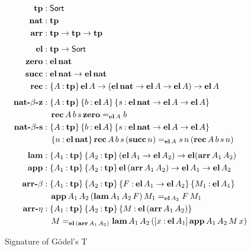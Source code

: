 \documentclass[11pt,twoside]{article}
\newcommand{\braces}[1]{\{#1\}}
\newcommand{\bracks}[1]{[#1]}
\newcommand{\parens}[1]{(#1)}
\newcommand{\sortclass}{\ensuremath{\textsf{Sort}}}
\newcommand{\eqclass}[3]{{#2}=_{#1}{#3}}
\newcommand{\piclass}[3]{\braces{{#2}\mathbin{:}{#1}}\,{#3}}
\newcommand{\arrclass}[2]{{#1}\to{#2}}
\newcommand{\lamobj}[3]{\bracks{{#2}\mathbin{:}{#1}}\,{#3}}
\newcommand{\appobj}[2]{{#1}\,{#2}}
\begin{document}
\begin{figure}
  
  \begin{align*}
    \tpsort
    & : \sortclass \\
    \nattp
    & : \tpsort \\
    \arrtp
    & : \arrclass{\tpsort}{\arrclass{\tpsort}{\tpsort}} \\[1ex]
    \elfam
%
    & : \arrclass{\tpsort}{\sortclass} \\
    \zerocon
    & : \elof{\nattp} \\
    \succcon
    & : \arrclass {\elof{\nattp}}{\elof{\nattp}} \\
    \reccon
    &  :
      \piclass{\tpsort}{A}{
      \arrclass{\elof{A}}{
      \arrclass{\parens{\arrclass{\elof{\nattp}}{\arrclass{\elof{A}}{\elof{A}}}}}{
      \elof{A}}}} \\[1ex] 
%
    \natbetaz
    & :
      \piclass{\tpsort}{A}{
      \piclass{\elof{A}}{b}{
      \piclass{\arrclass{\elof{\nattp}}{\arrclass{\elof{A}}{\elof{A}}}}{s}{
      }}} \\
    & \quad
      \eqclass{\elof{A}}{\recof{A}{b}{s}{\zerocon}}{b} \\
    \natbetas
    & :
      \piclass{\tpsort}{A}{
      \piclass{\elof{A}}{b}{
      \piclass{\arrclass{\elof{\nattp}}{\arrclass{\elof{A}}{\elof{A}}}}{s}{
      }}} \\
    & \quad
      \piclass{\elof{\nattp}}{n}{
      \eqclass{\elof{A}}
      {\recof{A}{b}{s}{\parens{\succof{n}}}}
      {\appobj{\appobj{s}{n}}{\parens{\recof{A}{b}{s}{n}}}}} \\[1ex]
%
    \lamcon
    & :
      \piclass{\tpsort}{A_{1}}{
      \piclass{\tpsort}{A_{2}}{
      \arrclass{\parens{\arrclass{\elof{A_{1}}}{\elof{A_{2}}}}}{
      \elfam{\parens{\arrof{A_{1}}{A_{2}}}}}}} \\
    \appcon
    & :
      \piclass{\tpsort}{A_{1}}{
      \piclass{\tpsort}{A_{2}}{
      \arrclass{\elofp{\arrof{A_{1}}{A_{2}}}}{
      \arrclass{\elof{A_{1}}}{\elof{A_{2}}}}}} \\[1ex]
%
    \arrbeta
    & :
      \piclass{\tpsort}{A_{1}}{
      \piclass{\tpsort}{A_{2}}{
      \piclass{\arrclass{\elof{A_{1}}}{\elof{A_{2}}}}{F}{
      \piclass{\elof{A_{1}}}{M_1}{
      }}}} \\
    & \quad
      \eqclass{\elof{A_{2}}}
      {\appof{A_{1}}{A_{2}}{\parens{\lamof{A_{1}}{A_{2}}{F}}}{M_1}}
      {\appobj{F}{M_1}} \\
    \arreta
    & :
      \piclass{\tpsort}{A_{1}}{
      \piclass{\tpsort}{A_{2}}{
      \piclass{\elofp{\arrof{A_{1}}{A_{2}}}}{M}{
      }}} \\
    & \quad
      \eqclass{\elofp{\arrof{A_{1}}{A_{2}}}}
      {M}
      {\lamof{A_{1}}{A_{2}}{\parens{\lamobj{\elof{A_{1}}}{x}{\appof{A_{1}}{A_{2}}{M}{x}}}}}
  \end{align*}

  \caption{Signature of G\"odel's T}
  \label{fig:t-sig}
\end{figure}
\end{document}
